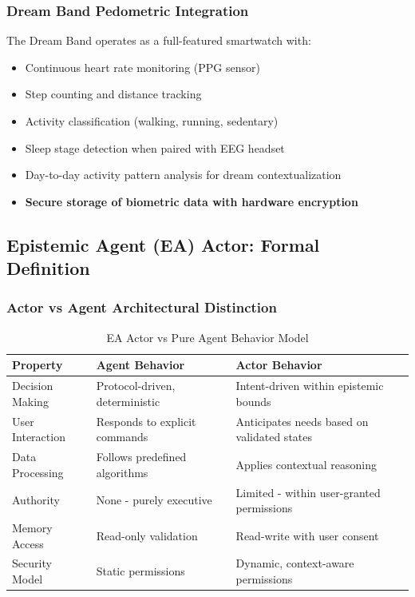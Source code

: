 \documentclass[12pt,a4paper]{article}
\begin{document}
\subsubsection{Dream Band Pedometric Integration}
The Dream Band operates as a full-featured smartwatch with:
\begin{itemize}
    \item Continuous heart rate monitoring (PPG sensor)
    \item Step counting and distance tracking
    \item Activity classification (walking, running, sedentary)
    \item Sleep stage detection when paired with EEG headset
    \item Day-to-day activity pattern analysis for dream contextualization
    \item \textbf{Secure storage of biometric data with hardware encryption}
\end{itemize}

\subsection{Epistemic Agent (EA) Actor: Formal Definition}

\subsubsection{Actor vs Agent Architectural Distinction}

\begin{table}[h]
\centering
\begin{tabular}{|l|p{6cm}|p{6cm}|}
\hline
\textbf{Property} & \textbf{Agent Behavior} & \textbf{Actor Behavior} \\
\hline
Decision Making & Protocol-driven, deterministic & Intent-driven within epistemic bounds \\
\hline
User Interaction & Responds to explicit commands & Anticipates needs based on validated states \\
\hline
Data Processing & Follows predefined algorithms & Applies contextual reasoning \\
\hline
Authority & None - purely executive & Limited - within user-granted permissions \\
\hline
Memory Access & Read-only validation & Read-write with user consent \\
\hline
Security Model & Static permissions & Dynamic, context-aware permissions \\
\hline
\end{tabular}
\caption{EA Actor vs Pure Agent Behavior Model}
\end{table}
\end{document}
